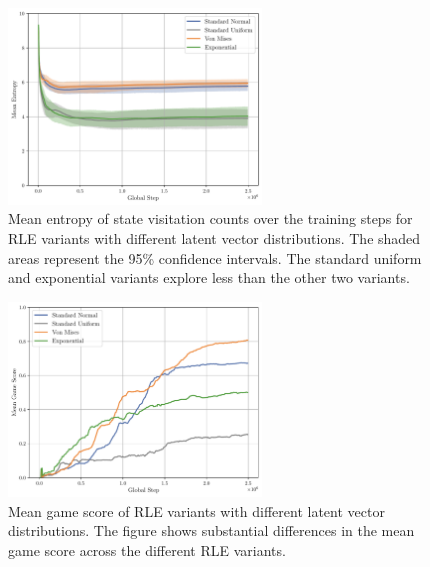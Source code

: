 \begin{figure}[h!]
  \centering
  \includegraphics[width=0.6\textwidth]{figures/gridworld_mean_entropy_state_visitation_distributions.pdf}
  \caption{Mean entropy of state visitation counts over the training steps for RLE variants with different latent vector distributions. The shaded areas represent the 95\% confidence intervals. The standard uniform and exponential variants explore less than the other two variants.}
  \label{fig:gridworld-entropy-distributions}
\end{figure}

\begin{figure}[h!]
  \centering
  \includegraphics[width=0.6\textwidth]{figures/gridworld_mean_game_score_distributions.pdf}
  \caption{Mean game score of RLE variants with different latent vector distributions. The figure shows substantial differences in the mean game score across the different RLE variants.}
  \label{fig:gridworld-score-distributions}
\end{figure}

